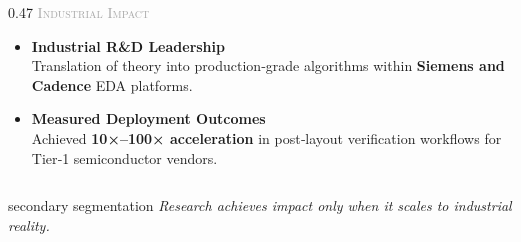 \begin{frame}[t]{\insertsectionhead}
\begin{columns}[t, onlytextwidth]
		\begin{column}{0.47\textwidth}
			\centering
			{\large \scshape\textcolor{darkgray}{Industrial Impact}} \\
			\vspace{0.5ex}

			\begin{block}{}
				\vspace{1ex}
				\begin{itemize}
					\item \textbf{Industrial R\&D Leadership} \\
					      Translation of theory into production‑grade algorithms within
					      \textbf{Siemens and Cadence} EDA platforms.

					      \vspace{2.5ex}

					\item \textbf{Measured Deployment Outcomes} \\
					      Achieved \textbf{10×–100× acceleration} in post‑layout verification
					      workflows for Tier‑1 semiconductor vendors.
				\end{itemize}
				\vspace{1ex}
			\end{block}
		\end{column}

	\end{columns}

	\vfill

	\begin{beamercolorbox}[wd=\textwidth, sep=1.2ex, center, rounded=true]{secondary segmentation}
		\itshape
		\textcolor{blue!80!black}
		{Research achieves impact only when it scales to industrial reality.}
	\end{beamercolorbox}

	\vfill
\end{frame}

